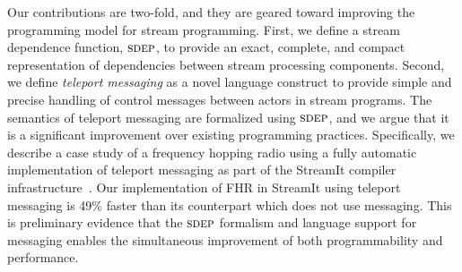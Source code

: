 Our contributions are two-fold, and they are geared toward improving
the programming model for stream programming. First, we  define a
stream dependence function, $\textsc{sdep}$, 
to  provide   an  exact,  complete,  and   compact  representation  of
dependencies between stream processing components.  
Second,  we define  {\it  teleport messaging}  as a  novel language
construct  to provide  simple  and precise  handling of control
messages between actors in stream
programs.
The semantics of teleport  messaging are formalized using $\textsc{sdep}$, and
we argue  that it is  a  significant  improvement  over  existing
programming practices. Specifically, we describe a case study of
a frequency  hopping radio using  a fully automatic  implementation of
teleport messaging  as   part  of   the   StreamIt   compiler
infrastructure~\cite{streamit-asplos,  streamitcc}. Our implementation
of FHR  in StreamIt using teleport  messaging is 49\%  faster than its
counterpart which does not use messaging. This is preliminary evidence
that
the $\textsc{sdep}$  formalism and language support for  messaging enables the
simultaneous improvement of both programmability and performance.

